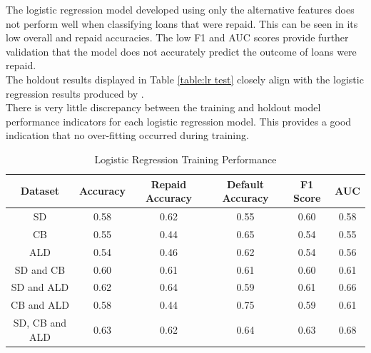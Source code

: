 The logistic regression model developed using only the alternative features does not perform well when classifying loans that were repaid. This can be seen in its low overall and repaid accuracies. The low F1 and AUC scores provide further validation that the model does not accurately predict the outcome of loans were repaid. \\

The holdout results displayed in Table \ref{table:lr test} closely align with the logistic regression results produced by \textcite{BigDataMicroFiance}. \\

There is very little discrepancy between the training and holdout model performance indicators for each logistic regression model. This provides a good indication that no over-fitting occurred during training. 

\vspace{10pt}

\begin{table}[H]
\begin{center}
\begin{tabular}{|c|c|c|c|c|c|} 
\hline
\multicolumn{1}{|c|}{Dataset}
&\multicolumn{1}{|c|}{Accuracy}
&\multicolumn{1}{|c|}{Repaid Accuracy}
&\multicolumn{1}{|c|}{Default Accuracy}
&\multicolumn{1}{|c|}{F1 Score}
&\multicolumn{1}{|c|}{AUC}\\
\hline
SD & 0.58 & 0.62 & 0.55 & 0.60 & 0.58    \\
\hline
CB & 0.55 & 0.44 & 0.65 & 0.54 & 0.55    \\
\hline
ALD & 0.54 & 0.46 & 0.62 & 0.54 & 0.56    \\
\hline
SD and CB & 0.60 & 0.61 & 0.61 & 0.60 & 0.61    \\
\hline
SD and ALD & 0.62 & 0.64 & 0.59 & 0.61 & 0.66    \\
\hline
CB and ALD & 0.58 & 0.44 & 0.75 & 0.59 & 0.61    \\
\hline
SD, CB and ALD & 0.63 & 0.62 & 0.64 & 0.63 & 0.68    \\
\hline
\end{tabular}
\end{center}
\caption{Logistic Regression Training Performance}
\label{table:lr training}
\end{table}

\vspace{10pt}

